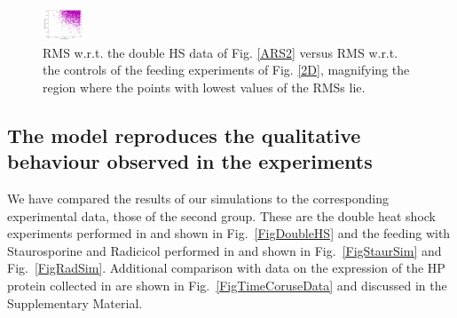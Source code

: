 \documentclass[oneside, 10pt, a4paper, twocolumn]{article}
\begin{document}
\begin{figure}
\centering
\includegraphics[width=\columnwidth]{2RMS5000zoom.pdf}
\caption{RMS w.r.t. the double HS data of Fig. \ref{ARS2} versus RMS w.r.t. the controls of the feeding experiments of Fig. \ref{2D}, magnifying the region where the points with lowest values of the RMSs lie. %
}
\label{2RMS5000zoom}
\end{figure}



\subsection{The model reproduces the qualitative behaviour observed in the experiments}

We have compared the results of our simulations to the corresponding experimental data, those of the second group. These are the double heat shock experiments performed in \cite{Schroda2000} and shown in Fig.~\ref{FigDoubleHS} and the feeding with Staurosporine and Radicicol performed in \cite{Schmollinger2013} and shown in Fig.~\ref{FigStaurSim} and Fig.~\ref{FigRadSim}. Additional comparison with data on the expression of the HP protein collected in \cite{Muehlhaus2011} are shown in Fig.~\ref{FigTimeCoruseData} and discussed in the Supplementary Material. 
\end{document}
